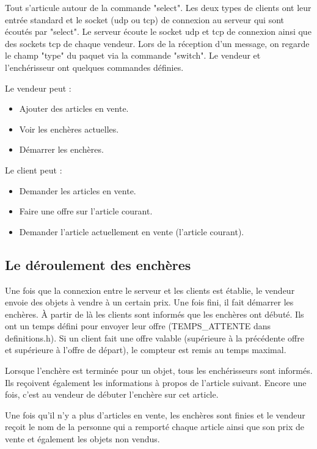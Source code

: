 Tout s'articule autour de la commande "select".
Les deux types de clients ont leur entrée standard et le socket (udp ou tcp) 
de connexion au serveur qui sont écoutés par "select".
Le serveur écoute le socket udp et tcp de connexion ainsi que des sockets tcp de chaque vendeur.
Lors de la réception d'un message, on regarde le champ "type" du paquet via la commande "switch".
Le vendeur et l'enchérisseur ont quelques commandes définies.

Le vendeur peut :
\begin{itemize}
\item Ajouter des articles en vente.
\item Voir les enchères actuelles.
\item Démarrer les enchères.
\end{itemize}

Le client peut :
\begin{itemize}
\item Demander les articles en vente.
\item Faire une offre sur l'article courant.
\item Demander l'article actuellement en vente (l'article courant).
\end{itemize}

\subsection{Le déroulement des enchères}
Une fois que la connexion entre le serveur et les clients est établie, 
le vendeur envoie des objets à vendre à un certain prix.
Une fois fini, il fait démarrer les enchères.
À partir de là les clients sont informés que les enchères ont débuté.
Ils ont un temps défini pour envoyer leur offre (TEMPS\_ATTENTE dans definitions.h).
Si un client fait une offre valable (supérieure à la précédente offre et supérieure à l'offre de départ),
le compteur est remis au temps maximal.

Lorsque l'enchère est terminée pour un objet, tous les enchérisseurs sont informés.
Ils reçoivent également les informations à propos de l'article suivant.
Encore une fois, c'est au vendeur de débuter l'enchère sur cet article.

Une fois qu'il n'y a plus d'articles en vente, les enchères sont finies
et le vendeur reçoit le nom de la personne qui a remporté chaque article ainsi que son prix de vente et
également les objets non vendus.
